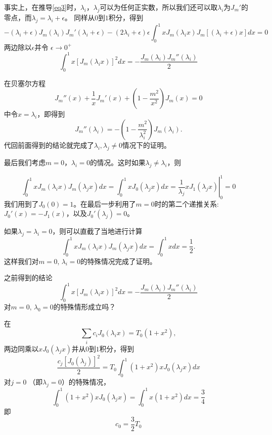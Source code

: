 \documentclass[CJK]{beamer}
\begin{document}
\begin{frame}
  \bch
  事实上，在推导\eqref{eq3}时，$\lambda_i$，$\lambda_j$可以为任何正实数，所以我们还可以取$\lambda_i$为$J_m'$的零点，而$\lambda_j = \lambda_i +\epsilon$。
    同样从$0$到$1$积分，得到
    $$ -(\lambda_i+\epsilon)J_m(\lambda_i) J_m'(\lambda_i+\epsilon)  -(2\lambda_i+\epsilon)\epsilon\int_0^1xJ_m(\lambda_ix)J_m[(\lambda_i+\epsilon)x]dx = 0 $$
    两边除以$\epsilon$并令 $\epsilon\rightarrow 0^+$
    $$ \int_0^1x\left[J_m(\lambda_ix)\right]^2dx = -\frac{J_m(\lambda_i)J_m''(\lambda_i)}{2} $$
    
  \ech
\end{frame}

\begin{frame}
  \bch
  在贝塞尔方程
  $$J_m''(x) + \frac{1}{x}J_m'(x) + \left(1-\frac{m^2}{x^2}\right)J_m(x) = 0$$
  中令$x = \lambda_i$，即得到
  $$J_m''(\lambda_i) = - \left(1-\frac{m^2}{\lambda_i^2}\right)J_m(\lambda_i).$$
  代回前面得到的结论就完成了$\lambda_i,\lambda_j \ne 0$情况下的证明。
  \ech
\end{frame}


\begin{frame}
  \bch
  最后我们考虑$m=0$，$\lambda_i=0$的情况。这时如果$\lambda_j\ne \lambda_i$，则
  

$$  \int_0^1 xJ_m(\lambda_ix)J_m(\lambda_jx) dx = \int_0^1xJ_0(\lambda_j x) dx
 = \left. \frac{1}{\lambda_j} xJ_1(\lambda_j x) \right\vert_0^1 =0 $$
我们用到了$J_0(0)=1$。在最后一步利用了$m=0$时的第二个递推关系: $J_0'(x) = - J_1(x)$，以及$J_0'(\lambda_j)=0$。

\skipline

  如果$\lambda_j=\lambda_i=0$，则可以直截了当地进行计算
  $$  \int_0^1 xJ_m(\lambda_ix)J_m(\lambda_jx) dx = \int_0^1 x dx  = \frac{1}{2} .$$
  这样我们对$m=0$, $\lambda_i=0$的特殊情况完成了证明。
  \ech
\end{frame}


\begin{frame}
  \bch
  
  之前得到的结论
  $$ \int_0^1x\left[J_m(\lambda_ix)\right]^2dx = -\frac{J_m(\lambda_i)J_m''(\lambda_i)}{2} $$
  对$m=0$, $\lambda_0=0$的特殊情形成立吗？
  
  \ech
\end{frame}

\begin{frame}
  \bch
  在
  $$ \sum_i c_iJ_0\left(\lambda_i x\right) = T_0\left(1+x^2\right), $$
  两边同乘以$xJ_0(\lambda_j x)$并从$0$到$1$积分，得到
  $$ \frac{c_j\left[J_0(\lambda_j)\right]^2}{2} = T_0 \int_0^1(1+x^2)xJ_0(\lambda_jx)dx $$
  对$j=0$ （即$\lambda_j =0$）的特殊情况，
  $$\int_0^1(1+x^2)xJ_0(\lambda_j x) = \int_0^1x(1+x^2)dx  =\frac{3}{4}$$
  即
  $$c_0 = \frac{3}{2}T_0$$
  \ech
\end{frame}
\end{document}
